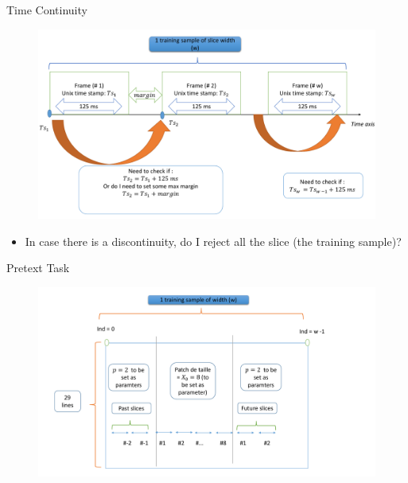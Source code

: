 \documentclass{Beamer}
\begin{document}
\begin{frame}[t]{Time Continuity}

\begin{figure}[h]
\centering
\includegraphics[scale=0.32]{Figures/Time_Continuity.pdf}
\end{figure}

\begin{itemize}

\item In case there is a discontinuity, do I reject all the slice (the training sample)? 

\end{itemize}


\end{frame}


\begin{frame}[t]{Pretext Task}

\begin{figure}[h]
\centering
\includegraphics[scale=0.35]{Figures/Pretext_Task.pdf}
\end{figure}




\end{frame}
\end{document}
